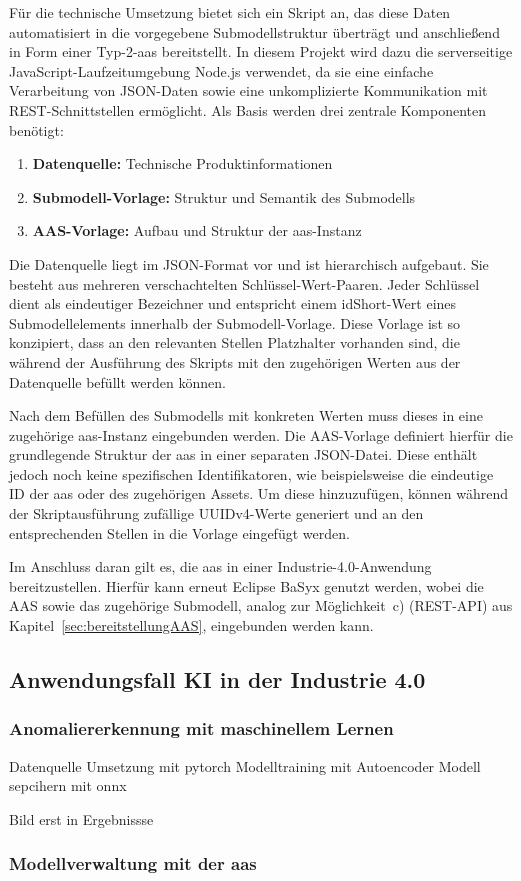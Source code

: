 Für die technische Umsetzung bietet sich ein Skript an, das diese Daten automatisiert in die vorgegebene Submodellstruktur überträgt und anschließend in Form einer Typ-2-\acs{aas} bereitstellt.
In diesem Projekt wird dazu die serverseitige JavaScript-Laufzeitumgebung Node.js \cite{nodejs} verwendet, da sie eine einfache Verarbeitung von JSON-Daten sowie eine unkomplizierte Kommunikation mit REST-Schnittstellen ermöglicht. 
Als Basis werden drei zentrale Komponenten benötigt:

\begin{enumerate}[noitemsep, leftmargin=*, label=\textbf{\arabic*.}]
    \item \textbf{Datenquelle:} Technische Produktinformationen
    \item \textbf{Submodell-Vorlage:} Struktur und Semantik des Submodells
    \item \textbf{AAS-Vorlage:} Aufbau und Struktur der \acs{aas}-Instanz
\end{enumerate}

Die Datenquelle liegt im JSON-Format vor und ist hierarchisch aufgebaut.
Sie besteht aus mehreren verschachtelten Schlüssel-Wert-Paaren.
Jeder Schlüssel dient als eindeutiger Bezeichner und entspricht einem idShort-Wert eines Submodellelements innerhalb der Submodell-Vorlage.
Diese Vorlage ist so konzipiert, dass an den relevanten Stellen Platzhalter vorhanden sind, die während der Ausführung des Skripts mit den zugehörigen Werten aus der Datenquelle befüllt werden können.

Nach dem Befüllen des Submodells mit konkreten Werten muss dieses in eine zugehörige \acs{aas}-Instanz eingebunden werden. 
Die AAS-Vorlage definiert hierfür die grundlegende Struktur der \acs{aas} in einer separaten JSON-Datei. 
Diese enthält jedoch noch keine spezifischen Identifikatoren, wie beispielsweise die eindeutige ID der \acs{aas} oder des zugehörigen Assets. 
Um diese hinzuzufügen, können während der Skriptausführung zufällige UUIDv4-Werte generiert und an den entsprechenden Stellen in die Vorlage eingefügt werden.

Im Anschluss daran gilt es, die \acs{aas} in einer Industrie-4.0-Anwendung bereitzustellen. 
Hierfür kann erneut Eclipse BaSyx genutzt werden, wobei die AAS sowie das zugehörige Submodell, analog zur Möglichkeit~c) (REST-API) aus Kapitel~\ref{sec:bereitstellungAAS}, eingebunden werden kann.


\subsection{Anwendungsfall KI in der Industrie 4.0}

\subsubsection{Anomaliererkennung mit maschinellem Lernen}
Datenquelle
Umsetzung mit pytorch
Modelltraining mit Autoencoder
Modell sepcihern mit onnx


Bild erst in Ergebnissse

\subsubsection{Modellverwaltung mit der \acs{aas}}

